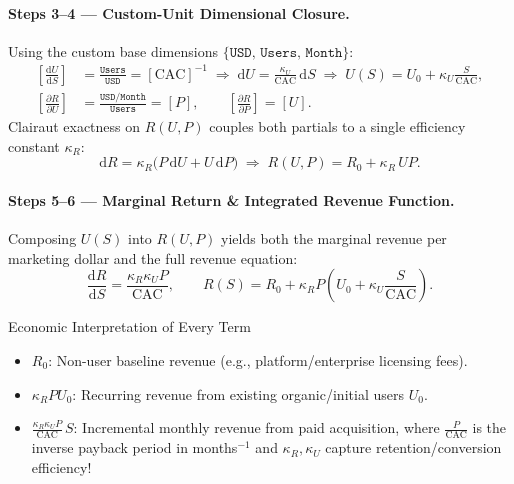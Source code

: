 \documentclass[11pt,a4paper]{article}
\newcommand{\dd}{\mathrm{d}}
\newcommand{\pd}[2]{\frac{\partial #1}{\partial #2}}
\newcommand{\td}[2]{\frac{\dd #1}{\dd #2}}
\newcommand{\dimbr}[1]{\left[#1\right]}
\begin{document}
\paragraph{Steps 3--4 — Custom-Unit Dimensional Closure.}
Using the custom base dimensions $\{\texttt{USD},\, \texttt{Users},\, \texttt{Month}\}$:
\begin{align}
  \dimbr{\td{U}{S}} &= \frac{\texttt{Users}}{\texttt{USD}} = \dimbr{\text{CAC}}^{-1}
  \;\Longrightarrow\; \dd U = \frac{\kappa_U}{\text{CAC}}\,\dd S
  \;\Longrightarrow\; U(S) = U_0 + \kappa_U \frac{S}{\text{CAC}},\\[4pt]
  \dimbr{\pd{R}{U}} &= \frac{\texttt{USD/Month}}{\texttt{Users}} = \dimbr{P},\qquad
  \dimbr{\pd{R}{P}} = \dimbr{U}.
\end{align}
Clairaut exactness on $R(U, P)$ couples both partials to a single efficiency constant $\kappa_R$:
\begin{equation}
  \dd R = \kappa_R\bigl(P\,\dd U + U\,\dd P\bigr)
  \;\Longrightarrow\;
  R(U, P) = R_0 + \kappa_R\, U P.
\end{equation}

\paragraph{Steps 5--6 — Marginal Return \& Integrated Revenue Function.}
Composing $U(S)$ into $R(U, P)$ yields both the marginal revenue per marketing dollar and the full revenue equation:
\begin{equation}
  \td{R}{S} = \frac{\kappa_R \kappa_U P}{\text{CAC}},
  \qquad
  R(S) = R_0 + \kappa_R P \left(U_0 + \kappa_U \frac{S}{\text{CAC}}\right).
\end{equation}

\begin{insightbox}{Economic Interpretation of Every Term}
\begin{itemize}[leftmargin=1.4em,itemsep=2pt]
  \item $R_0$: Non-user baseline revenue (e.g., platform/enterprise licensing fees).
  \item $\kappa_R P U_0$: Recurring revenue from existing organic/initial users $U_0$.
  \item $\frac{\kappa_R \kappa_U P}{\text{CAC}}\,S$: Incremental monthly revenue from paid acquisition, where $\frac{P}{\text{CAC}}$ is the inverse payback period in months$^{-1}$ and $\kappa_R, \kappa_U$ capture retention/conversion efficiency!
\end{itemize}
\end{insightbox}
\end{document}

